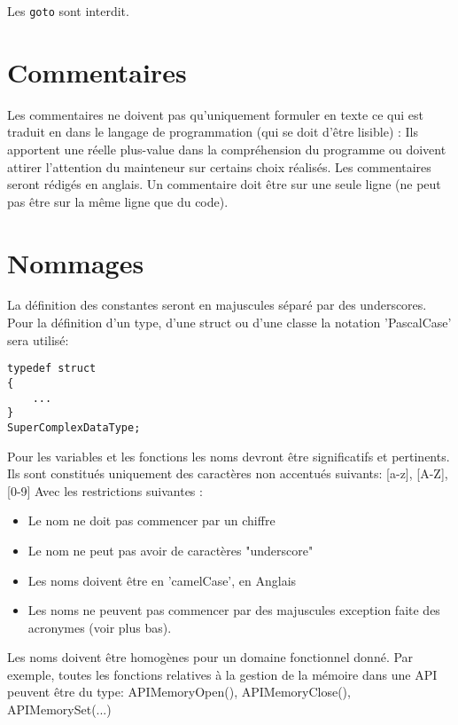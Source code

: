 Les \texttt{goto} sont interdit.

\section{Commentaires}
Les commentaires ne doivent pas qu’uniquement formuler en texte ce qui est traduit 
en dans le langage de programmation (qui se doit d'être lisible) : \newline 
Ils apportent une réelle plus-value dans la compréhension du programme ou doivent
attirer l’attention du mainteneur sur certains choix réalisés. Les commentaires seront 
rédigés en anglais. \newline
Un commentaire doit être sur une seule ligne (ne peut pas être sur la même ligne 
que du code).
 
\section{Nommages}
La définition des constantes seront en majuscules séparé par des underscores.\newline
Pour la définition d'un type, d'une struct ou d'une classe la notation 'PascalCase'
sera utilisé: 
\begin{verbatim}
typedef struct 
{
    ...
}
SuperComplexDataType;
\end{verbatim}

Pour les variables et les fonctions les noms devront être significatifs et 
pertinents.\newline
Ils sont constitués uniquement des caractères non accentués suivants: 
[a-z], [A-Z], [0-9]\newline
Avec les restrictions suivantes :
\begin{itemize}
	\item Le nom ne doit pas commencer par un chiffre
	\item Le nom ne peut pas avoir de caractères "underscore"
	\item Les noms doivent être en 'camelCase', en Anglais
	\item Les noms ne peuvent pas commencer par des majuscules exception faite
          des acronymes (voir plus bas).
\end{itemize}
Les noms doivent être homogènes pour un domaine fonctionnel donné. Par exemple, 
toutes les fonctions relatives à la gestion de la mémoire dans une API peuvent 
être du type: \newline 
APIMemoryOpen(), APIMemoryClose(), APIMemorySet(...)

